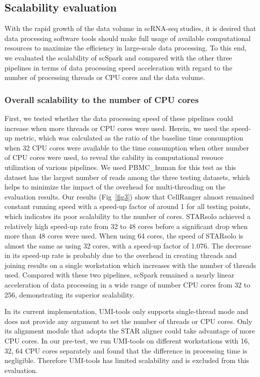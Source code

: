 \documentclass[conference]{IEEEtran}
\begin{document}
\subsection{Scalability evaluation}
With the rapid growth of the data volume in scRNA-seq studies, it is desired that data processing software tools should make full usage of available computational resources to maximize the efficiency in large-scale data processing. To this end, we evaluated the scalability of scSpark and compared with the other three pipelines in terms of data processing speed acceleration with regard to the number of processing threads or CPU cores and the data volume.

\subsubsection{Overall scalability to the number of CPU cores}
First, we tested whether the data processing speed of these pipelines could increase when more threads or CPU cores were used. Herein, we used the speed-up metric, which was calculated as the ratio of the baseline time consumption when 32 CPU cores were available to the time consumption when other number of CPU cores were used, to reveal the cability in computational resouce utilization of various pipelines. 
We used PBMC\_human for this test as this dataset has the largest number of reads among the three testing datasets, which helps to minimize the impact of the overhead for multi-threading on the evaluation results. 
Our results (Fig~\ref{fig3}) show that CellRanger almost remained constant running speed with a speed-up factor of around 1 for all testing points, which indicates its poor scalability to the number of cores. 
STARsolo achieved a relatively high speed-up rate from 32 to 48 cores before a significant drop when more than 48 cores were used. When using 64 cores, the speed of STARsolo is almost the same as using 32 cores, with a speed-up factor of 1.076. 
The decrease in its speed-up rate is probably due to the overhead in creating threads and joining results on a single workstation which increases with the number of threads used. 
Compared with these two pipelines, scSpark remained a nearly linear acceleration of data processing in a wide range of number CPU cores from 32 to 256, demonstrating its superior scalability. 

In its current implementation, UMI-tools only supports single-thread mode and does not provide any argument to set the number of threads or CPU cores. Only its alignment module that adopts the STAR aligner could take advantage of more CPU cores. 
In our pre-test, we run UMI-tools on different workstations with 16, 32, 64 CPU cores separately and found that the difference in processing time is negligible. 
Therefore UMI-tools has limited scalability and is excluded from this evaluation. 
\end{document}
